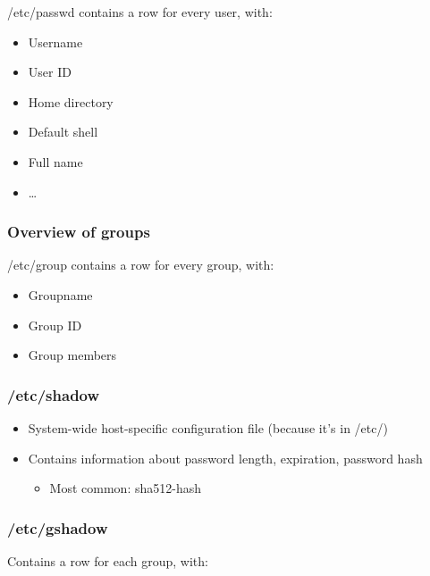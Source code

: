 \documentclass{article}
\begin{document}
/etc/passwd contains a row for every user, with:

\begin{itemize}
    \item Username
    \item User ID
    \item Home directory
    \item Default shell
    \item Full name
    \item \dots
\end{itemize}

\subsubsection{Overview of groups}

/etc/group contains a row for every group, with:

\begin{itemize}
    \item Groupname
    \item Group ID
    \item Group members
\end{itemize}

\subsubsection{/etc/shadow}

\begin{itemize}
    \item System-wide host-specific configuration file (because it's in /etc/)
    \item Contains information about password length, expiration, password hash
    \begin{itemize}
        \item Most common: sha512-hash
    \end{itemize}
\end{itemize}

\subsubsection{/etc/gshadow}

Contains a row for each group, with:
\end{document}
